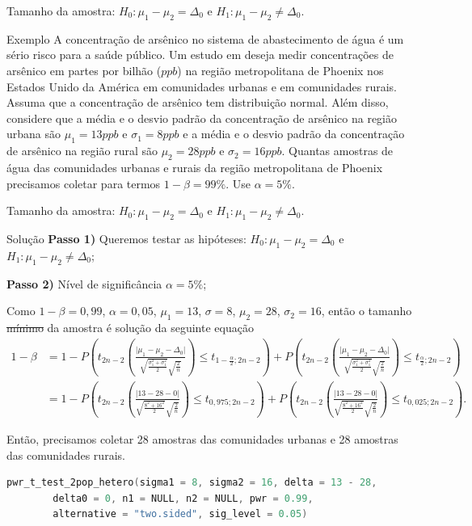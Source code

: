\documentclass[9pt]{beamer}
\begin{document}
\begin{frame}{Tamanho da amostra: $H_0:\mu_1 - \mu_2 = \Delta_0$ e $H_1: \mu_1 - \mu_2 \neq \Delta_0$.}

\begin{block}{Exemplo}
	A concentração de arsênico no sistema de abastecimento de água é um sério risco para a saúde público. Um estudo em deseja medir concentrações de arsênico em partes por bilhão ($ppb$) na região metropolitana de Phoenix nos Estados Unido da América em comunidades urbanas e em comunidades rurais. Assuma que a concentração de arsênico tem distribuição normal. Além disso, considere que a média e o desvio padrão da concentração de arsênico na região urbana são $\mu_1 = 13 ppb$ e $\sigma_1=8 ppb$ e a média e o desvio padrão da concentração de arsênico na região rural são $\mu_2=28 ppb$ e $\sigma_2=16 ppb$. Quantas amostras de água das comunidades urbanas e rurais da região metropolitana de Phoenix precisamos coletar para termos $1-\beta=99\%$. Use $\alpha=5\%$.	
\end{block}
\end{frame}

\begin{frame}[fragile]{Tamanho da amostra: $H_0:\mu_1 - \mu_2 = \Delta_0$ e $H_1: \mu_1 - \mu_2 \neq \Delta_0$.}

\begin{block}{Solução}
	\textbf{Passo 1)} Queremos testar as hipóteses: $H_0: \mu_1 - \mu_2 = \Delta_0$ e $H_1: \mu_1 - \mu_2 \neq \Delta_0$;
	
	\textbf{Passo 2)} Nível de significância $\alpha=5\%$;
	
	Como $1-\beta=0,99$, $\alpha=0,05$, $\mu_1=13$, $\sigma=8$, $\mu_2=28$, $\sigma_2=16$, então o tamanho \sout{mínimo} da amostra é solução da seguinte equação
	\tiny
	\begin{align*}
		1-\beta &=  1 - P\left( t_{2n-2}\left( \frac{\lvert \mu_1 - \mu_2 - \Delta_0 \rvert}{\sqrt{\frac{\sigma_1^2 + \sigma_1^2}{2}} \sqrt{\frac{2}{n}}} \right) \leq t_{1-\frac{\alpha}{2};2n-2} \right)+P\left( t_{2n-2}\left( \frac{\lvert \mu_1 - \mu_2 - \Delta_0\rvert}{\sqrt{\frac{\sigma_1^2 + \sigma_1^2}{2}} \sqrt{\frac{2}{n}}} \right) \leq t_{\frac{\alpha}{2};2n-2} \right)\\
		&=  1 - P\left( t_{2n-2}\left( \frac{\lvert 13 - 28 - 0 \rvert}{\sqrt{\frac{8^2 + 16^2}{2}} \sqrt{\frac{2}{n}}} \right) \leq t_{0,975;2n-2} \right)+P\left( t_{2n-2}\left( \frac{\lvert 13 - 28 - 0\rvert}{\sqrt{\frac{8^2 + 16^2}{2}} \sqrt{\frac{2}{n}}} \right) \leq t_{0,025;2n-2} \right).
	\end{align*}
	\normalsize
	
	Então, precisamos coletar 28 amostras das comunidades urbanas e 28 amostras das comunidades rurais.
\end{block}

\begin{lstlisting}[language = C, caption = Código no R.]
pwr_t_test_2pop_hetero(sigma1 = 8, sigma2 = 16, delta = 13 - 28,
		delta0 = 0, n1 = NULL, n2 = NULL, pwr = 0.99,
		alternative = "two.sided", sig_level = 0.05)
\end{lstlisting}

\end{frame}
\end{document}
